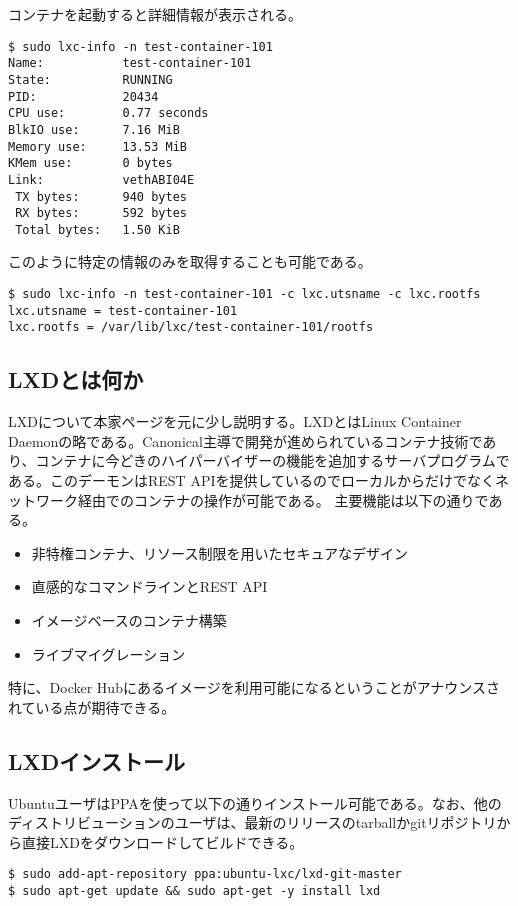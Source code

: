 \documentclass[9pt,b5paper,tombo]{jsbook}
\begin{document}
\noindent
コンテナを起動すると詳細情報が表示される。

\begin{lstlisting}
$ sudo lxc-info -n test-container-101
Name:           test-container-101
State:          RUNNING
PID:            20434
CPU use:        0.77 seconds
BlkIO use:      7.16 MiB
Memory use:     13.53 MiB
KMem use:       0 bytes
Link:           vethABI04E
 TX bytes:      940 bytes
 RX bytes:      592 bytes
 Total bytes:   1.50 KiB
\end{lstlisting}


\noindent
このように特定の情報のみを取得することも可能である。

\begin{lstlisting}
$ sudo lxc-info -n test-container-101 -c lxc.utsname -c lxc.rootfs
lxc.utsname = test-container-101
lxc.rootfs = /var/lib/lxc/test-container-101/rootfs
\end{lstlisting}

\newpage

\subsection{LXDとは何か}
LXDについて本家ページを元に少し説明する。LXDとはLinux Container Daemonの略である。Canonical主導で開発が進められているコンテナ技術であり、コンテナに今どきのハイパーバイザーの機能を追加するサーバプログラムである。このデーモンはREST APIを提供しているのでローカルからだけでなくネットワーク経由でのコンテナの操作が可能である。
\noindent
主要機能は以下の通りである。
\begin{itemize}
  \item 非特権コンテナ、リソース制限を用いたセキュアなデザイン
  \item 直感的なコマンドラインとREST API
  \item イメージベースのコンテナ構築
  \item ライブマイグレーション
\end{itemize}

\noindent
特に、Docker Hubにあるイメージを利用可能になるということがアナウンスされている点が期待できる。


\subsection{LXDインストール}
UbuntuユーザはPPAを使って以下の通りインストール可能である。なお、他のディストリビューションのユーザは、最新のリリースのtarballかgitリポジトリから直接LXDをダウンロードしてビルドできる。
\begin{lstlisting}
$ sudo add-apt-repository ppa:ubuntu-lxc/lxd-git-master
$ sudo apt-get update && sudo apt-get -y install lxd
\end{lstlisting}
\end{document}
